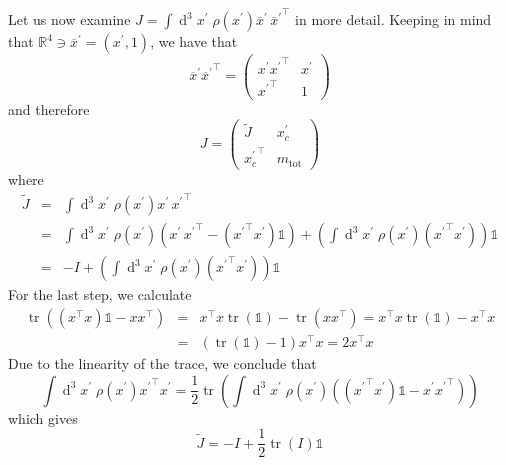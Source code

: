 \documentclass[a4paper]{article}
\begin{document}
Let us now examine $J = \int \operatorname{d}^3\!x^\prime\; \rho(x^\prime) \overline{x}^\prime\,{\overline{x}^\prime}^\top$ in more detail. Keeping in mind that $\mathbb{R}^4 \ni \overline{x}^\prime = (x^\prime, 1)$, we have that
\begin{equation}
\overline{x}^\prime {\overline{x}^\prime}^\top =
\left(\begin{array}{cc}
x^\prime {x^\prime}^\top & x^\prime\\
{x^\prime}^\top & 1
\end{array}\right)
\end{equation}
and therefore
\begin{equation}
\label{eqn:j}
J = \left(\begin{array}{cc}
\tilde{J} & x_c^\prime\\
{x_c^\prime}^\top & m_\mathrm{tot}
\end{array}\right)
\end{equation}
where
\begin{eqnarray}
\nonumber \tilde{J} &=& \int \operatorname{d}^3\!x^\prime\; \rho(x^\prime) x^\prime\,{x^\prime}^\top\\
\nonumber &=& \int \operatorname{d}^3\!x^\prime\; \rho(x^\prime) \left(x^\prime\,{x^\prime}^\top - ({x^\prime}^\top x^\prime) \mathbb{1} \right) + \left( \int \operatorname{d}^3\!x^\prime\; \rho(x^\prime) ({x^\prime}^\top{x^\prime}) \right) \mathbb{1}\\
&=& -I + \left( \int \operatorname{d}^3\!x^\prime\; \rho(x^\prime) ({x^\prime}^\top{x^\prime}) \right) \mathbb{1}
\end{eqnarray}
For the last step, we calculate
\begin{eqnarray}
\nonumber \operatorname{tr}((x^\top x) \mathbb{1} - x x^\top)
&=& x^\top x \operatorname{tr}(\mathbb{1}) - \operatorname{tr}(xx^\top)
= x^\top x \operatorname{tr}(\mathbb{1}) - x^\top x\\
&=& (\operatorname{tr}(\mathbb{1}) - 1) x^\top x
= 2 x^\top x
\end{eqnarray}
Due to the linearity of the trace, we conclude that
\begin{equation}
\int\operatorname{d}^3\!x^\prime\; \rho(x^\prime) {x^\prime}^\top x^\prime
= \frac{1}{2} \operatorname{tr} \left( \int\operatorname{d}^3\!x^\prime\; \rho(x^\prime) \left( ({x^\prime}^\top x^\prime) \mathbb{1} - x^\prime {x^\prime}^\top \right) \right)
\end{equation}
which gives
\begin{equation}
\label{eqn:jtilde}
\tilde{J} = -I + \frac{1}{2} \operatorname{tr}(I) \mathbb{1}
\end{equation}
\end{document}
